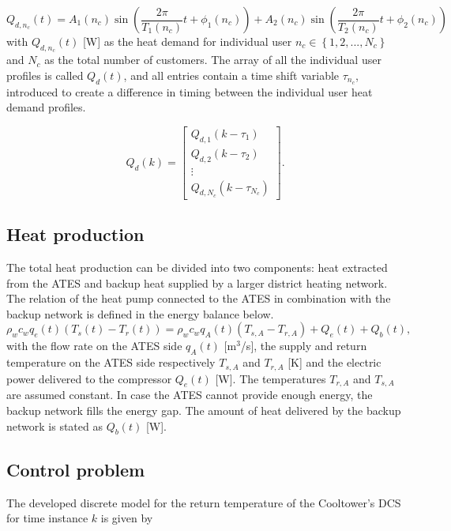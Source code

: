 \begin{equation}
Q_{d,n_c}(t)=A_1(n_c) \sin(\frac{2 \pi}{T_1(n_c)} t + \phi_1(n_c)) + A_2(n_c)\sin(\frac{2 \pi}{T_2(n_c)} t + \phi_2(n_c))
\end{equation}
with $Q_{d,n_c}(t)$ [W] as the heat demand for individual user $n_c \in \left\{1,2,...,N_c \right\}$ and $N_c$ as the total number of customers. The array of all the individual user profiles is called $Q_d(t)$, and all entries contain a time shift variable $\tau_{n_c}$, introduced to create a difference in timing between the individual user heat demand profiles.

\begin{equation}
Q_d(k) = 
\left[\begin{array}{c}
Q_{d,1}(k-\tau_1) \\
Q_{d,2}(k-\tau_2) \\
\vdots \\
Q_{d,N_c}(k - \tau_{N_c})
\end{array}\right].
\end{equation}

\subsection{Heat production}
The total heat production can be divided into two components: heat extracted from the ATES and backup heat supplied by a larger district heating network. The relation of the heat pump connected to the ATES in combination with the backup network is defined in the energy balance below.
\begin{equation}
    \rho_w c_w q_e(t) \left(T_s(t) - T_r(t)\right) = \rho_w c_w q_{A}(t)\left(T_{s,A} - T_{r,A}\right) + Q_e(t) + Q_{b}(t),
\end{equation}
with the flow rate on the ATES side $q_A(t)$ [m$^3$/s], the supply and return temperature on the ATES side respectively $T_{s,A}$ and $T_{r,A}$ [K] and the electric power delivered to the compressor $Q_e(t)$ [W]. The temperatures $T_{r,A}$ and $T_{s,A}$ are assumed constant. In case the ATES cannot provide enough energy, the backup network fills the energy gap. The amount of heat delivered by the backup network is stated as $Q_{b}(t)$ [W].

\subsection{Control problem}
The developed discrete model for the return temperature of the Cooltower's DCS for time instance $k$ is given by

